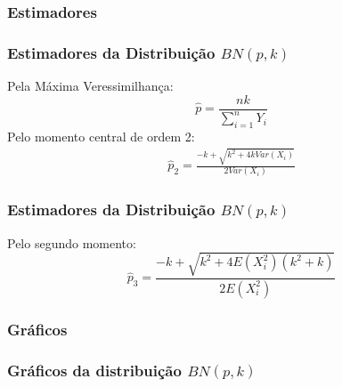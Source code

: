 \subsubsection{Estimadores}
\begin{frame}
\frametitle{Estimadores da Distribuição $BN(p,k)$}
Pela Máxima Veressimilhança:
\begin{equation}
\label{eq:BN_MV}
{\hat{p}} = {\frac{n k}{\sum_{i=1}^{n}{Y_{i}}}}
\end{equation} \pause
Pelo momento central de ordem 2:
\begin{eqnarray}
\label{eq:BN_m_p2}
{\hat{p}_{2}} = {\frac{-k + \sqrt{k^{2}+4k{Var(X_{i})}}}{2{Var(X_{i})}}}
\end{eqnarray}
\end{frame}

\begin{frame}
\frametitle{Estimadores da Distribuição $BN(p,k)$}
Pelo segundo momento:
\begin{equation}
\label{eq:BN_m_p3}
{\widehat{p}_{3}} = {\frac{{-k} + {\sqrt{k^{2} + 4 E(X_{i}^{2})(k^{2}+k)}}}{2E(X_{i}^{2})}}
\end{equation}

\end{frame}


\subsubsection{Gráficos}
\begin{frame}
\frametitle{Gráficos da distribuição $BN(p,k)$}

\end{frame}

